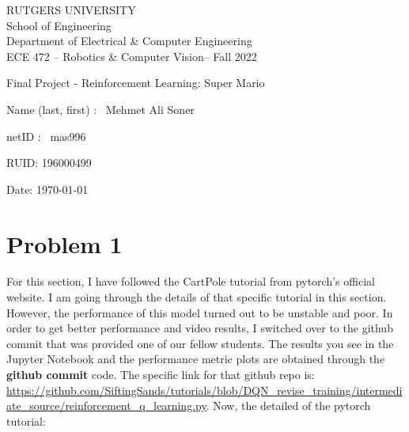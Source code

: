 \documentclass{article}
\numberwithin{equation}{section}
\numberwithin{equation}{section}
\def\ce{\begin{center}}
\def\cend{\end{center}}
\def\red{\color{red}}
\def\blue{\color{blue}}
\begin{document}
\ce
\red\Large
RUTGERS UNIVERSITY \\[0.05in]
School of Engineering \\[0.05in]
Department of Electrical \& Computer Engineering \\[0.2in]
\blue ECE 472 -- Robotics \& Computer Vision-- Fall 2022
\cend

\vspace{1in}

\huge \blue 

\begin{center}
Final Project - Reinforcement Learning: Super Mario
\end{center}

\vspace{1in}

\Large

Name (last, first) : \ Mehmet Ali Soner 

\vspace{0.3in}

netID : \ mas996

\vspace{0.3in}

RUID:  196000499

\vspace{0.3in}

Date: \today




\vspace{1in}

\color{black} \normalsize


\newpage




\section*{Problem 1}
For this section, I have followed the CartPole tutorial from pytorch's official website. I am going through the details of that specific tutorial in this section. However, the performance of this model turned out to be unstable and poor. In order to get better performance and video results, I switched over to the github commit that was provided one of our fellow students. The results you see in the Jupyter Notebook and the performance metric plots are obtained through the \textbf{github commit} code. The specific link for that github repo is: \url{https://github.com/SiftingSands/tutorials/blob/DQN_revise_training/intermediate_source/reinforcement_q_learning.py}. Now, the detailed of the pytorch tutorial:
\end{document}
